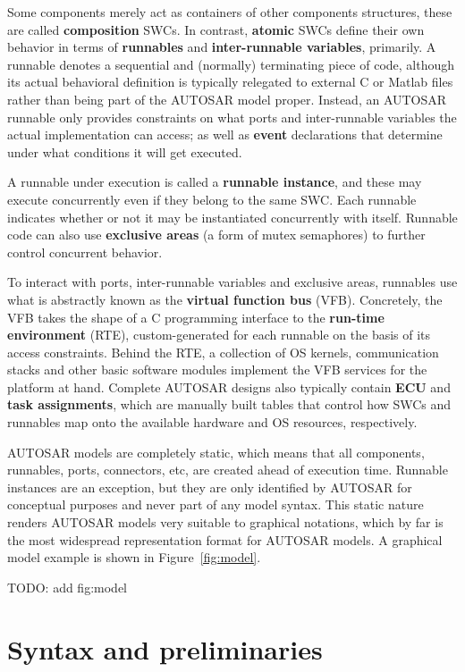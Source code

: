 \documentclass[twocolumn]{article}
\begin{document}
Some components merely act as containers of other components structures, these are called \textbf{composition} SWCs. In contrast, \textbf{atomic} SWCs define their own behavior in terms of \textbf{runnables} and \textbf{inter-runnable variables}, primarily. A runnable denotes a sequential and (normally) terminating piece of code, although its actual behavioral definition is typically relegated to external C or Matlab files rather than being part of the AUTOSAR model proper. Instead, an AUTOSAR runnable  only provides constraints on what ports and inter-runnable variables the actual implementation can access; as well as \textbf{event} declarations that determine under what conditions it will get executed.

A runnable under execution is called a \textbf{runnable instance}, and these may execute concurrently even if they belong to the same SWC. Each runnable indicates whether or not it may be instantiated concurrently with itself. Runnable code can also use \textbf{exclusive areas} (a form of mutex semaphores) to further control concurrent behavior.

To interact with ports, inter-runnable variables and exclusive areas, runnables use what is abstractly known as the \textbf{virtual function bus} (VFB). Concretely, the VFB takes the shape of a C programming interface to the \textbf{run-time environment} (RTE), custom-generated for each runnable on the basis of its access constraints. Behind the RTE, a collection of OS kernels, communication stacks and other basic software modules implement the VFB services for the platform at hand. Complete AUTOSAR designs also typically contain \textbf{ECU} and \textbf{task assignments}, which are manually built tables that control how SWCs and runnables map onto the available hardware and OS resources, respectively.

AUTOSAR models are completely static, which means that all components, runnables, ports, connectors, etc, are created ahead of execution time. Runnable instances are an exception, but they are only identified by AUTOSAR for conceptual purposes and never part of any model syntax. This static nature renders AUTOSAR models very suitable to graphical notations, which by far is the most widespread representation format for AUTOSAR models. A graphical model example is shown in Figure~\ref{fig:model}.

TODO: add fig:model

\section{Syntax and preliminaries}
\label{sec:Calc}
\end{document}

